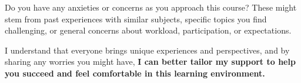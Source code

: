 \documentclass{ximera}
\author{Bart Snapp}
\begin{document}
\begin{question}
    Do you have any anxieties or concerns as you approach this course? These
    might stem from past experiences with similar subjects, specific topics you
    find challenging, or general concerns about workload, participation, or
    expectations.
    
    
    I understand that everyone brings unique experiences and
    perspectives, and by sharing any worries you might have, \textbf{I can better tailor my
    support to help you succeed and feel comfortable in this learning environment.}
    \begin{freeResponse}
    \end{freeResponse}
\end{question}
\end{document}
